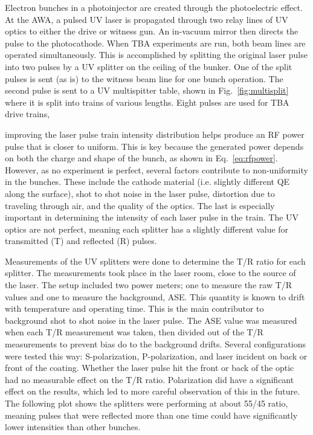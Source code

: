 \documentclass{iitthesis}
\begin{document}
Electron bunches in a photoinjector are created through the photoelectric effect. 
At the AWA, a pulsed UV laser is propagated through two relay lines of UV optics to either
the drive or witness gun. An in-vacuum mirror then directs the pulse to the photocathode.
When TBA experiments are run, both beam lines are operated simultaneously. This is accomplished by
splitting the original laser pulse into two pulses by a UV splitter on the 
ceiling of the bunker. One of the split pulses is sent (as is) to the witness beam line for one
bunch operation. The second pulse is sent to a UV multispitter table, shown in 
Fig.~\ref{fig:multisplit} where it is split into trains of various lengths. Eight pulses are 
used for TBA drive trains, 

improving the laser pulse train intensity distribution helps
produce an RF power pulse that is closer to uniform. This is key because the generated power depends on both the 
charge and shape of the bunch, as shown in Eq.~\ref{eq:rfpower}. However, as no experiment is perfect, 
several factors contribute to non-uniformity in the bunches. These include the cathode material
(i.e. slightly different QE along the surface), shot to shot noise in the laser pulse, 
distortion due to traveling through air, and the quality of the optics. The last is especially important 
in determining the intensity of each laser pulse in the train.  The UV optics are not perfect, 
meaning each splitter has a slightly different value for transmitted (T) and reflected (R) pulses. 

 \label{sec:splitmeasure}
Measurements of the UV splitters were done to determine the T/R ratio for 
each splitter. The measurements took place in the laser room, close to the source of the laser.
The setup included two power meters; one to measure the raw T/R values and one to measure 
the background, ASE. This quantity is known to drift with temperature and operating time. 
This is the main contributor to background shot to shot noise in the laser pulse. 
The ASE value was measured when each T/R measurement was taken, then divided out of the T/R 
measurements to prevent bias do to the background drifts. 
Several configurations were tested this way: S-polarization, P-polarization, 
and laser incident on back or front of the coating. Whether the laser pulse hit the front or back of the optic
had no measurable effect on the T/R ratio. Polarization did have a significant effect on
the results, which led to more careful observation of this in the future.
The following plot shows the splitters were performing at about 55/45 ratio, meaning
pulses that were reflected more than one time could have significantly lower intensities than other bunches. 
\begin{figure}[h]
	\begin{center}
	\end{center}
	\label{fig:origtrain}
\end{figure}
\end{document}
